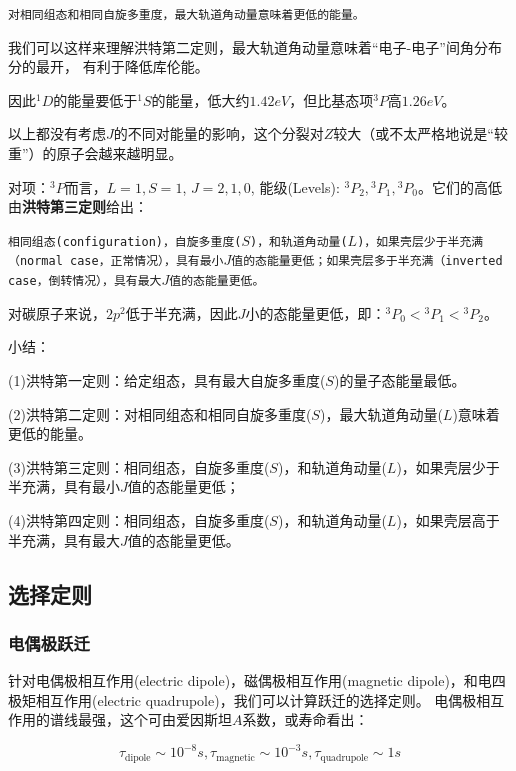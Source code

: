 \texttt{对相同组态和相同自旋多重度，最大轨道角动量意味着更低的能量。}

我们可以这样来理解洪特第二定则，最大轨道角动量意味着“电子-电子”间角分布分的最开，
有利于降低库伦能。

因此$^1D$的能量要低于$^1S$的能量，低大约$1.42eV$，但比基态项$^3P$高$1.26eV$。

以上都没有考虑$J$的不同对能量的影响，这个分裂对$Z$较大（或不太严格地说是“较重”）的原子会越来越明显。

对项：$^3P$而言，$L=1, S=1$, $J=2,1,0$, 能级(Levels): ${}^3P_2,
{}^3P_1, {}^3P_0$。它们的高低由\textbf{洪特第三定则}给出：

\texttt{相同组态(configuration)，自旋多重度($S$)，和轨道角动量($L$)，如果壳层少于半充满（normal
case，正常情况），具有最小$J$值的态能量更低；如果壳层多于半充满（inverted
case，倒转情况），具有最大$J$值的态能量更低。}

对碳原子来说，$2p^2$低于半充满，因此$J$小的态能量更低，即：${}^3P_0
< {}^3P_1 < {}^3P_2$。

小结：

(1)洪特第一定则：给定组态，具有最大自旋多重度($S$)的量子态能量最低。

(2)洪特第二定则：对相同组态和相同自旋多重度($S$)，最大轨道角动量($L$)意味着更低的能量。

(3)洪特第三定则：相同组态，自旋多重度($S$)，和轨道角动量($L$)，如果壳层少于半充满，具有最小$J$值的态能量更低；

(4)洪特第四定则：相同组态，自旋多重度($S$)，和轨道角动量($L$)，如果壳层高于半充满，具有最大$J$值的态能量更低。


\subsection{选择定则}

\subsubsection{电偶极跃迁}

针对电偶极相互作用(electric dipole)，磁偶极相互作用(magnetic
dipole)，和电四极矩相互作用(electric
quadrupole)，我们可以计算跃迁的选择定则。
电偶极相互作用的谱线最强，这个可由爱因斯坦$A$系数，或寿命看出：

\begin{equation*}
    \tau_{\text{dipole}} \sim 10^{-8}s, \tau_{\text{magnetic}} \sim 10^{-3}s,
    \tau_{\text{quadrupole}} \sim 1s
\end{equation*}


